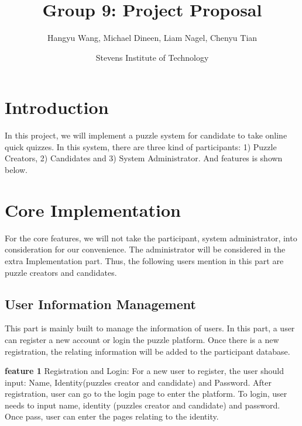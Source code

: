 \documentclass{article}
\title{Group 9: Project Proposal} %
\author{Hangyu Wang, Michael Dineen, Liam Nagel, Chenyu Tian\\}%
\date{Stevens Institute of Technology} %
\begin{document}
\maketitle %


\section*{Introduction} %

In this project, we will implement a puzzle system for candidate to take online quick quizzes. In this system, there are three kind of participants: 1) Puzzle Creators, 2) Candidates and 3) System Administrator. And features is shown below.





\section{Core Implementation} %

For the core features, we will not take the participant, system administrator, into consideration for our convenience. The administrator will be considered in the extra Implementation part. Thus, the following users mention in this part are puzzle creators and candidates.

\subsection{User Information Management}
This part is mainly built to manage the information of users. In this part, a user can register a new account or login the puzzle platform. Once there is a new registration, the relating information will be added to the participant database. 

 \textbf{feature 1} Registration and Login: For a new user to register, the user should input: Name, Identity(puzzles creator and candidate) and Password. After registration, user can go to the login page to enter the platform. To login, user needs to input name, identity (puzzles creator and candidate) and password. Once pass, user can enter the pages relating to the identity.
 
\end{document}

